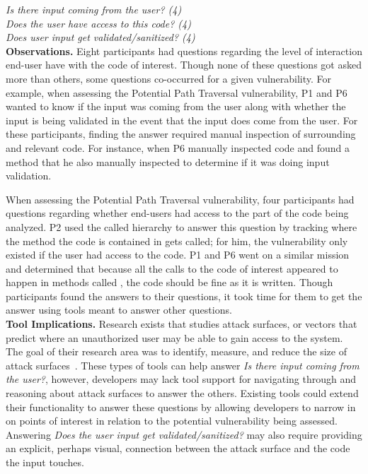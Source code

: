 \documentclass[conference]{IEEEtran}
\begin{document}
\noindent\emph{Is there input coming from the user? (4)} \\
\emph{Does the user have access to this code? (4)} \\
\emph{Does user input get validated/sanitized? (4)} \\


\noindent\textbf{Observations.}
Eight participants had questions regarding the level of interaction end-user have with the code of interest. 
Though none of these questions got asked more than others, some questions co-occurred for a given vulnerability.
For example, when assessing the Potential Path Traversal vulnerability, P1 and P6 wanted to know if the input was coming from the user along with whether the input is being validated in the event that the input does come from the user.
For these participants, finding the answer required manual inspection of surrounding and relevant code. 
For instance, when P6 manually inspected code and found a  method that he also manually inspected to determine if it was doing input validation.

When assessing the Potential Path Traversal vulnerability, four participants had questions regarding whether end-users had access to the part of the code being analyzed.
P2 used the called hierarchy to answer this question by tracking where the method the code is contained in gets called; for him, the vulnerability only existed if the user had access to the code.
P1 and P6 went on a similar mission and determined that because all the calls to the code of interest appeared to happen in methods called , the code should be fine as it is written.
Though participants found the answers to their questions, it took time for them to get the answer using tools meant to answer other questions.
\\

\noindent\textbf{Tool Implications.}
Research exists that studies attack surfaces, or vectors that predict where an unauthorized user may be able to gain access to the system.
The goal of their research area was to identify, measure, and reduce the size of attack surfaces~\cite{manadhata2011attack, bartel2012automatically}. These types of tools can help answer \textit{Is there input coming from the user?}, however, developers may lack tool support for navigating through and reasoning about attack surfaces to answer the others.
Existing tools could extend their functionality to answer these questions by allowing developers to narrow in on points of interest in relation to the potential vulnerability being assessed.
Answering \textit{Does the user input get validated/sanitized?} may also require providing an explicit, perhaps visual, connection between the attack surface and the code the input touches.
\end{document}
